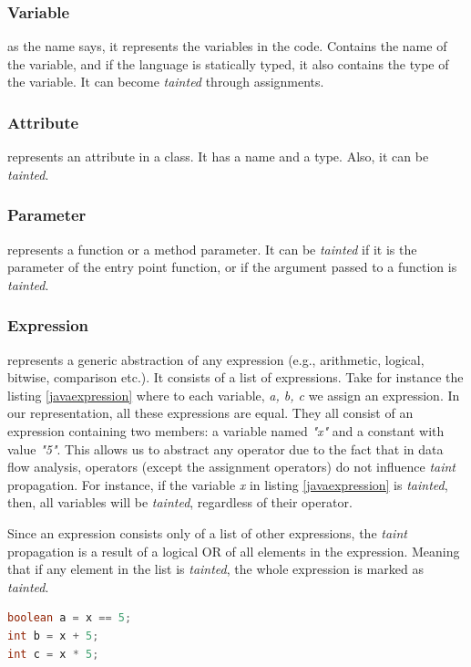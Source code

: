\subsubsection{Variable} as the name says, it represents the variables in the code. Contains the name of the variable, and if the language is statically typed, it also contains the type of the variable. It can become \textit{tainted} through assignments.

\subsubsection{Attribute} represents an attribute in a class. It has a name and a type. Also, it can be \textit{tainted}.

\subsubsection{Parameter} represents a function or a method parameter. It can be \textit{tainted} if it is the parameter of the entry point function, or if the argument passed to a function is \textit{tainted}.

\subsubsection{Expression} represents a generic abstraction of any expression (e.g., arithmetic, logical, bitwise, comparison etc.). It consists of a list of expressions.
Take for instance the listing \ref{javaexpression} where to each variable, \textit{a, b, c} we assign an expression. In our representation, all these expressions are equal. They all consist of an expression containing two members: a variable named \textit{"x"} and a constant with value \textit{"5"}. This allows us to abstract any operator due to the fact that in data flow analysis, operators (except the assignment operators) do not influence \textit{taint} propagation. For instance, if the variable \textit{x} in listing \ref{javaexpression} is \textit{tainted}, then, all variables will be \textit{tainted}, regardless of their operator.


Since an expression consists only of a list of other expressions, the \textit{taint} propagation is a result of a logical OR of all elements in the expression. Meaning that if any element in the list is \textit{tainted}, the whole expression is marked as \textit{tainted}. 

\begin{lstlisting}[language=Java,
    showstringspaces=false,
    caption={Expression assignment examples},
    label=javaexpression]
boolean a = x == 5;
int b = x + 5;
int c = x * 5;
\end{lstlisting}

